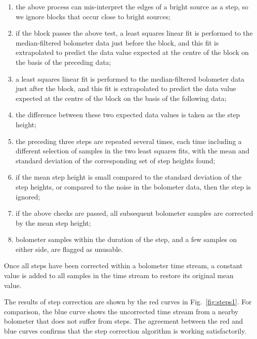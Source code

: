 \documentclass[useAMS,usenatbib,nofootinbib]{mn2e}
\begin{document}
\begin{enumerate}

\item the above process can mis-interpret the edges of a bright source
as a step, so we ignore blocks that occur close to bright sources;

\item if the block passes the above test, a least squares linear fit
is performed to the median-filtered bolometer data just before the
block, and this fit is extrapolated to predict the data value expected
at the centre of the block on the basis of the preceding data;

\item a least squares linear fit is performed to the median-filtered
bolometer data just after the block, and this fit is extrapolated to
predict the data value expected at the centre of the block on the
basis of the following data;

\item the difference between these two expected data values is taken
as the step height;

\item the preceding three steps are repeated several times, each time
including a different selection of samples in the two least squares
fits, with the mean and standard deviation of the corresponding set of
step heights found;

\item if the mean step height is small compared to the standard deviation
of the step heights, or compared to the noise in the bolometer data, then
the step is ignored;

\item if the above checks are passed, all subsequent bolometer samples
are corrected by the mean step height;

\item bolometer samples within the duration of the step, and a few
samples on either side, are flagged as unusable.

\end{enumerate}

Once all steps have been corrected within a bolometer time stream, a
constant value is added to all samples in the time stream to restore its
original mean value.

The results of step correction are shown by the red curves in
Fig.~\ref{fig:steps1}. For comparison, the blue curve shows the
uncorrected time stream from a nearby bolometer that does not suffer from
steps. The agreement between the red and blue curves confirms that
the step correction algorithm is working satisfactorily.
\end{document}

